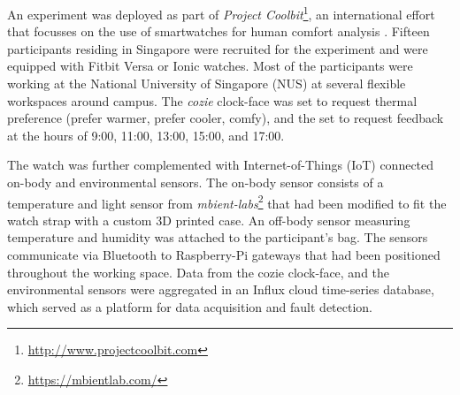 
An experiment was deployed as part of \emph{Project Coolbit}\footnote{\url{http://www.projectcoolbit.com}}, an international effort that focusses on the use of smartwatches for human comfort analysis \cite{nazarian2019geophysics}. Fifteen participants residing in Singapore were recruited for the experiment and were equipped with Fitbit Versa or Ionic watches. Most of the participants were working at the National University of Singapore (NUS) at several flexible workspaces around campus.  The \emph{cozie} clock-face was set to request thermal preference (prefer warmer, prefer cooler, comfy), and the set to request feedback at the hours of 9:00, 11:00, 13:00, 15:00, and 17:00. 

The watch was further complemented with Internet-of-Things (IoT) connected on-body and environmental sensors. The on-body sensor consists of a temperature and light sensor from \emph{mbient-labs}\footnote{\url{https://mbientlab.com/}} that had been modified to fit the watch strap with a custom 3D printed case. An off-body sensor measuring temperature and humidity was attached to the participant's bag. The sensors communicate via Bluetooth to Raspberry-Pi gateways that had been positioned throughout the working space. Data from the cozie clock-face, and the environmental sensors were aggregated in an Influx cloud time-series database, which served as a platform for data acquisition and fault detection. 



